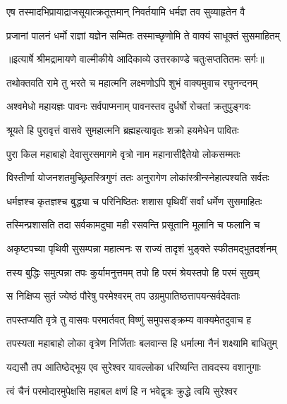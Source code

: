 \twolineshloka
{एष तस्मादभिप्रायाद्राजसूयात्क्रतूत्तमान्}
{निवर्तयामि धर्मज्ञ तव सुव्याहृतेन वै} %

\twolineshloka
{प्रजानां पालनं धर्मो राज्ञां यज्ञेन सम्मितः}
{तस्माच्छृणोमि ते वाक्यं साधूक्तं सुसमाहितम्} %


{॥इत्यार्षे श्रीमद्रामायणे वाल्मीकीये आदिकाव्ये उत्तरकाण्डे चतुःसप्ततितमः सर्गः॥}


\twolineshloka
{तथोक्तवति रामे तु भरते च महात्मनि}
{लक्ष्मणोऽपि शुभं वाक्यमुवाच रघुनन्दनम्} %

\twolineshloka
{अश्वमेधो महायज्ञः पावनः सर्वपाप्मनाम्}
{पावनस्तव दुर्धर्षो रोचतां क्रतुपुङ्गवः} %

\twolineshloka
{श्रूयते हि पुरावृत्तं वासवे सुमहात्मनि}
{ब्रह्महत्यावृतः शक्रो हयमेधेन पावितः} %

\twolineshloka
{पुरा किल महाबाहो देवासुरसमागमे}
{वृत्रो नाम महानासीद्दैतेयो लोकसम्मतः} %

\twolineshloka
{विस्तीर्णा योजनशतमुच्छ्रितस्त्रिगुणं ततः}
{अनुरागेण लोकांस्त्रीन्स्नेहात्पश्यति सर्वतः} %

\twolineshloka
{धर्मज्ञश्च कृतज्ञश्च बुद्ध्या च परिनिष्ठितः}
{शशास पृथिवीं सर्वां धर्मेण सुसमाहितः} %

\twolineshloka
{तस्मिन्प्रशासति तदा सर्वकामदुघा मही}
{रसवन्ति प्रसूतानि मूलानि च फलानि च} %

\twolineshloka
{अकृष्टपच्या पृथिवी सुसम्पन्ना महात्मनः}
{स राज्यं तादृशं भुङ्क्ते स्फीतमद्भुतदर्शनम्} %

\twolineshloka
{तस्य बुद्धिः समुत्पन्ना तपः कुर्यामनुत्तमम्}
{तपो हि परमं श्रेयस्तपो हि परमं सुखम्} %

\twolineshloka
{स निक्षिप्य सुतं ज्येष्ठं पौरेषु परमेश्वरम्}
{तप उग्रमुपातिष्ठत्तापयन्सर्वदेवताः} %

\twolineshloka
{तपस्तप्यति वृत्रे तु वासवः परमार्तवत्}
{विष्णुं समुपसङ्क्रम्य वाक्यमेतदुवाच ह} %

\twolineshloka
{तपस्यता महाबाहो लोका वृत्रेण निर्जिताः}
{बलवान्स हि धर्मात्मा नैनं शक्ष्यामि बाधितुम्} %

\twolineshloka
{यद्यसौ तप आतिष्ठेद्भूय एव सुरेश्वर}
{यावल्लोका धरिष्यन्ति तावदस्य वशानुगाः} %

\twolineshloka
{त्वं चैनं परमोदारमुपेक्षसि महाबल}
{क्षणं हि न भवेद्वृत्रः क्रुद्धे त्वयि सुरेश्वर} %

